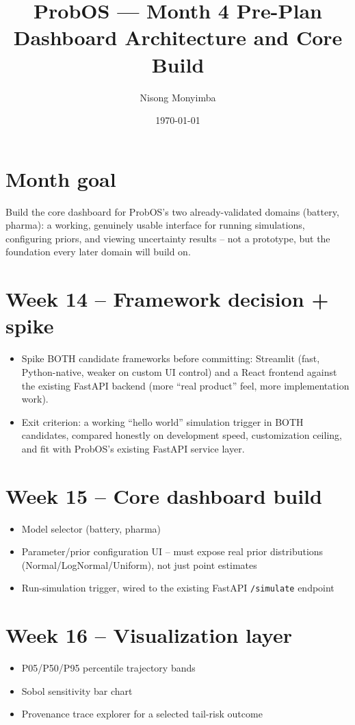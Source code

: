 \documentclass[11pt]{article}
\title{ProbOS --- Month 4 Pre-Plan\\Dashboard Architecture and Core Build}
\author{Nisong Monyimba}
\date{\today}
\begin{document}
\maketitle

\section*{Month goal}
Build the core dashboard for ProbOS's two already-validated domains
(battery, pharma): a working, genuinely usable interface for running
simulations, configuring priors, and viewing uncertainty results --
not a prototype, but the foundation every later domain will build on.

\section*{Week 14 -- Framework decision + spike}
\begin{itemize}[leftmargin=*]
  \item Spike BOTH candidate frameworks before committing:
    Streamlit (fast, Python-native, weaker on custom UI control) and
    a React frontend against the existing FastAPI backend (more
    ``real product'' feel, more implementation work).
  \item Exit criterion: a working ``hello world'' simulation trigger
    in BOTH candidates, compared honestly on development speed,
    customization ceiling, and fit with ProbOS's existing FastAPI
    service layer.
\end{itemize}

\section*{Week 15 -- Core dashboard build}
\begin{itemize}[leftmargin=*]
  \item Model selector (battery, pharma)
  \item Parameter/prior configuration UI -- must expose real prior
    distributions (Normal/LogNormal/Uniform), not just point
    estimates
  \item Run-simulation trigger, wired to the existing FastAPI
    \texttt{/simulate} endpoint
\end{itemize}

\section*{Week 16 -- Visualization layer}
\begin{itemize}[leftmargin=*]
  \item P05/P50/P95 percentile trajectory bands
  \item Sobol sensitivity bar chart
  \item Provenance trace explorer for a selected tail-risk outcome
\end{itemize}
\end{document}
